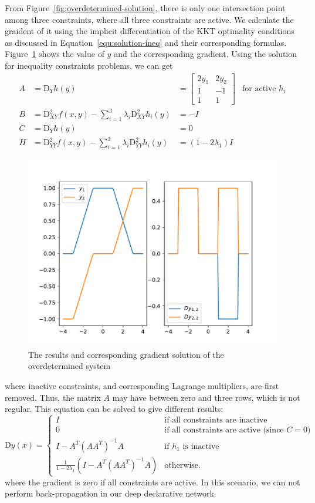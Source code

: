 From Figure~\ref{fig:overdetermined-solution}, there is only one intersection point among three constraints, where all three constraints are active. We calculate the graident of it using the implicit differentiation of the KKT optimality conditions as discussed in Equation~\ref{equ:solution-ineq} and their corresponding formulas. Figure~\ref{fig:overdetermined-gradient} shows the value of $y$ and the corresponding gradient. Using the solution for inequality constraints problems, we can get
$$
\begin{array}{llll}
    A &= \text{D}_{Y} h(y) &= \begin{bmatrix}
         2 y_1 & 2 y_2 \\ 1 & -1 \\ 1 & 1
         \end{bmatrix} & \text{for active $h_i$} \\
    B &= \text{D}^2_{XY} f(x, y) - \sum_{i=1}^{3} \lambda_i \text{D}^2_{XY} h_i(y) &= -I \\
    C &= \text{D}_{Y} h(y) &= 0 \\
    H &= \text{D}^2_{YY} f(x, y) - \sum_{i=1}^{3} \lambda_i \text{D}^2_{YY} h_i(y) &= (1 - 2 \lambda_1) I 
\end{array}
$$
\begin{figure}[t]
    \label{fig:overdetermined-gradient}
    \centering
    \includegraphics[page=1, width=.8\textwidth]{figs/overdetermined-gradient.pdf}
    \caption{The results and corresponding gradient solution of the overdetermined system~\citep{SG:19}}
\end{figure}
where inactive constraints, and corresponding Lagrange multipliers, are first removed. Thus, the matrix $A$ may have between zero and three rows, which is not regular. This equation can be solved to give different results: 
$$
\text{D} y(x) = \begin{cases}
        I & \text{if all constraints are inactive} \\
        0 & \text{if all constraints are active (since $C = 0$)} \\
        I - A^T (AA^T)^{-1} A & \text{if $h_1$ is inactive} \\
        \frac{1}{1 - 2 \lambda_1} \left(I - A^T (AA^T)^{-1} A\right) & \text{otherwise.}
    \end{cases}
$$
where the gradient is zero if all constraints are active. In this scenario, we can not perform back-propagation in our deep declarative network. 

